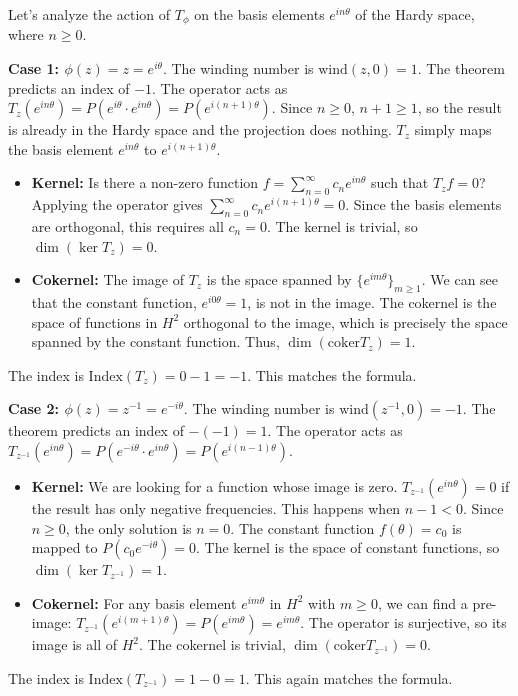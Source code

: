 \begin{solution}
    Let's analyze the action of $T_\phi$ on the basis elements $e^{in\theta}$ of the Hardy space, where $n \ge 0$.

    \textbf{Case 1: $\phi(z) = z = e^{i\theta}$}. The winding number is $\text{wind}(z,0)=1$. The theorem predicts an index of $-1$.
    The operator acts as $T_z(e^{in\theta}) = P(e^{i\theta} \cdot e^{in\theta}) = P(e^{i(n+1)\theta})$. Since $n \ge 0$, $n+1 \ge 1$, so the result is already in the Hardy space and the projection does nothing. $T_z$ simply maps the basis element $e^{in\theta}$ to $e^{i(n+1)\theta}$.
    \begin{itemize}
        \item \textbf{Kernel:} Is there a non-zero function $f = \sum_{n=0}^\infty c_n e^{in\theta}$ such that $T_z f = 0$? Applying the operator gives $\sum_{n=0}^\infty c_n e^{i(n+1)\theta} = 0$. Since the basis elements are orthogonal, this requires all $c_n=0$. The kernel is trivial, so $\dim(\ker T_z) = 0$.
        \item \textbf{Cokernel:} The image of $T_z$ is the space spanned by $\{e^{im\theta}\}_{m \ge 1}$. We can see that the constant function, $e^{i0\theta}=1$, is not in the image. The cokernel is the space of functions in $H^2$ orthogonal to the image, which is precisely the space spanned by the constant function. Thus, $\dim(\text{coker} T_z) = 1$.
    \end{itemize}
    The index is $\text{Index}(T_z) = 0 - 1 = -1$. This matches the formula.

    \textbf{Case 2: $\phi(z) = z^{-1} = e^{-i\theta}$}. The winding number is $\text{wind}(z^{-1},0)=-1$. The theorem predicts an index of $-(-1) = 1$.
    The operator acts as $T_{z^{-1}}(e^{in\theta}) = P(e^{-i\theta} \cdot e^{in\theta}) = P(e^{i(n-1)\theta})$.
    \begin{itemize}
        \item \textbf{Kernel:} We are looking for a function whose image is zero. $T_{z^{-1}}(e^{in\theta}) = 0$ if the result has only negative frequencies. This happens when $n-1 < 0$. Since $n \ge 0$, the only solution is $n=0$. The constant function $f(\theta)=c_0$ is mapped to $P(c_0 e^{-i\theta}) = 0$. The kernel is the space of constant functions, so $\dim(\ker T_{z^{-1}}) = 1$.
        \item \textbf{Cokernel:} For any basis element $e^{im\theta}$ in $H^2$ with $m \ge 0$, we can find a pre-image: $T_{z^{-1}}(e^{i(m+1)\theta}) = P(e^{im\theta}) = e^{im\theta}$. The operator is surjective, so its image is all of $H^2$. The cokernel is trivial, $\dim(\text{coker} T_{z^{-1}}) = 0$.
    \end{itemize}
    The index is $\text{Index}(T_{z^{-1}}) = 1 - 0 = 1$. This again matches the formula.
 \end{solution}

